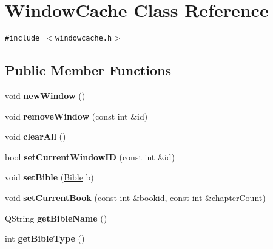 \hypertarget{classWindowCache}{
\section{WindowCache Class Reference}
\label{classWindowCache}
}
{\tt \#include $<$windowcache.h$>$}

\subsection*{Public Member Functions}
\begin{CompactItemize}
\item 
\hypertarget{classWindowCache_b82c978bb59d65ec4000f9c7881341e4}{
void \textbf{newWindow} ()}
\label{classWindowCache_b82c978bb59d65ec4000f9c7881341e4}

\item 
\hypertarget{classWindowCache_bde6a44bf7d1ee74f5e0df76318d122e}{
void \textbf{removeWindow} (const int \&id)}
\label{classWindowCache_bde6a44bf7d1ee74f5e0df76318d122e}

\item 
\hypertarget{classWindowCache_bd278b1ee7fc49c4c9b8c903beba951d}{
void \textbf{clearAll} ()}
\label{classWindowCache_bd278b1ee7fc49c4c9b8c903beba951d}

\item 
\hypertarget{classWindowCache_c6edb962fa1a8e45411549c56f0efe56}{
bool \textbf{setCurrentWindowID} (const int \&id)}
\label{classWindowCache_c6edb962fa1a8e45411549c56f0efe56}

\item 
\hypertarget{classWindowCache_b2b5db93f83cb93e43cfe8b8dbbd5628}{
void \textbf{setBible} (\hyperlink{classBible}{Bible} b)}
\label{classWindowCache_b2b5db93f83cb93e43cfe8b8dbbd5628}

\item 
\hypertarget{classWindowCache_99be6dddf13d1948d73b1086be05ccf0}{
void \textbf{setCurrentBook} (const int \&bookid, const int \&chapterCount)}
\label{classWindowCache_99be6dddf13d1948d73b1086be05ccf0}

\item 
\hypertarget{classWindowCache_442f941e3eb2613193fbadd879099c7f}{
QString \textbf{getBibleName} ()}
\label{classWindowCache_442f941e3eb2613193fbadd879099c7f}

\item 
\hypertarget{classWindowCache_a4149a2481f8a0815a1f14031bac5209}{
int \textbf{getBibleType} ()}
\label{classWindowCache_a4149a2481f8a0815a1f14031bac5209}


\end{CompactItemize}
